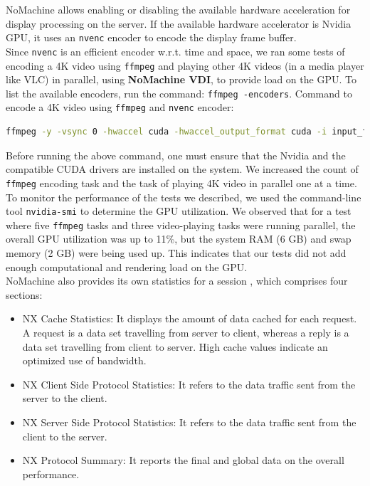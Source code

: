 \documentclass[a4paper,12pt, final]{report}
\begin{document}
\noindent NoMachine allows enabling or disabling the available hardware acceleration for display processing on the server. If the available hardware accelerator is Nvidia GPU, it uses an \verb|nvenc| encoder to encode the display frame buffer.\\

\noindent Since \verb|nvenc| is an efficient encoder w.r.t. time and space, we ran some tests of encoding a 4K video using \verb|ffmpeg| and playing other 4K videos (in a media player like VLC) in parallel, using \textbf{NoMachine VDI}, to provide load on the GPU. To list the available encoders, run the command: \verb|ffmpeg -encoders|. Command to encode a 4K video using \verb|ffmpeg| and \verb|nvenc| encoder:

\begin{mdframed}[backgroundcolor=cyan!20]
    \begin{lstlisting}[language=bash]
ffmpeg -y -vsync 0 -hwaccel cuda -hwaccel_output_format cuda -i input_file.mp4 -c:a copy -c:v h264_nvenc -b:v 5M output_file.mp4
    \end{lstlisting}
\end{mdframed}

\noindent Before running the above command, one must ensure that the Nvidia and the compatible CUDA drivers are installed on the system. We increased the count of \verb|ffmpeg| encoding task and the task of playing 4K video in parallel one at a time.\\

\noindent To monitor the performance of the tests we described, we used the command-line tool \verb|nvidia-smi| to determine the GPU utilization. We observed that for a test where five \verb|ffmpeg| tasks and three video-playing tasks were running parallel, the overall GPU utilization was up to 11\%, but the system RAM (6 GB) and swap memory (2 GB) were being used up. This indicates that our tests did not add enough computational and rendering load on the GPU.\\

\noindent NoMachine also provides its own statistics for a session \cite{nomachine_stats}, which comprises four sections:
\begin{itemize}
    \item NX Cache Statistics: It displays the amount of data cached for each request. A request is a data set travelling from server to client, whereas a reply is a data set travelling from client to server. High cache values indicate an optimized use of bandwidth.
    \item NX Client Side Protocol Statistics: It refers to the data traffic sent from the server to the client.
    \item NX Server Side Protocol Statistics: It refers to the data traffic sent from the client to the server.
    \item NX Protocol Summary: It reports the final and global data on the overall performance.
\end{itemize}
\end{document}
